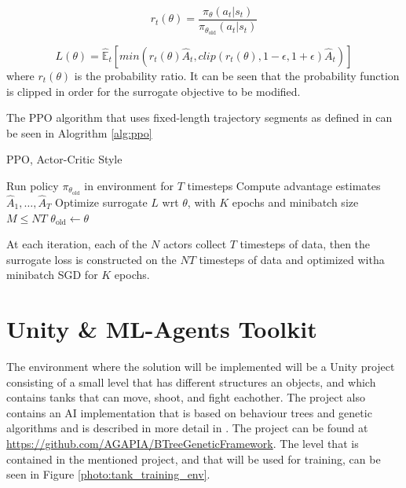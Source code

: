 \begin{equation}
    r_t(\theta) = \frac{\pi_{\theta} (a_t | s_t)}{\pi_{\theta_{\text{old}}} (a_t | s_t)}
\end{equation}

\begin{equation}
    L(\theta) = \hat{\mathbb{E}}_{t} [min(r_t(\theta) \hat{A}_{t}, clip(r_t(\theta), 1-\epsilon, 1+\epsilon) \hat{A}_{t})]
\end{equation}
where $r_t(\theta)$ is the probability ratio. It can be seen that the probability function is clipped in order for the surrogate objective to be modified.

The PPO algorithm that uses fixed-length trajectory segments as defined in \cite{schulman2017ppo} can be seen in Alogrithm \ref{alg:ppo}

\begin{algorithm}
    \caption{PPO, Actor-Critic Style}\label{alg:ppo}
    \begin{algorithmic}
            \State Run policy $\pi_{\theta_{\text{old}}}$ in environment for $T$ timesteps
            \State Compute advantage estimates $\hat{A}_{1}, \dots, \hat{A}_{T}$
        \EndFor
        \State Optimize surrogate $L$ wrt $\theta$, with $K$ epochs and minibatch size $M \leq NT$
        \State $\theta_{\text{old}} \gets \theta$
    \EndFor
    \end{algorithmic}
\end{algorithm}

At each iteration, each of the $N$ actors collect $T$ timesteps of data, then the surrogate loss is constructed on the $NT$ timesteps of data and optimized witha  minibatch SGD for $K$ epochs.


\section{Unity \& ML-Agents Toolkit}

The environment where the solution will be implemented will be a Unity project consisting of a small level that has different structures an objects, and which contains tanks that can move, shoot, and fight eachother. The project also contains an AI implementation that is based on behaviour trees and genetic algorithms and is described in more detail in \cite{paduraru2019automatic}. The project can be found at \url{https://github.com/AGAPIA/BTreeGeneticFramework}. The level that is contained in the mentioned project, and that will be used for training, can be seen in Figure \ref{photo:tank_training_env}.

